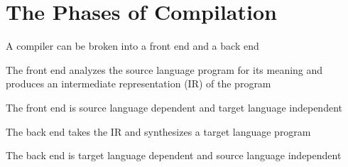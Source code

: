 \documentclass[8pt,a4paper,compress]{beamer}
\begin{document}
\section{The Phases of Compilation}
\begin{frame}[fragile]
\pause

A compiler can be broken into a front end and a back end

\begin{center}
\end{center}

\pause\bigskip

The front end analyzes the source language program for its meaning and produces an intermediate representation (IR) of the program

\pause\bigskip

The front end is source language dependent and target language independent

\pause\bigskip

The back end takes the IR and synthesizes a target language program

\pause\bigskip

The back end is target language dependent and source language independent
\end{frame}
\end{document}
